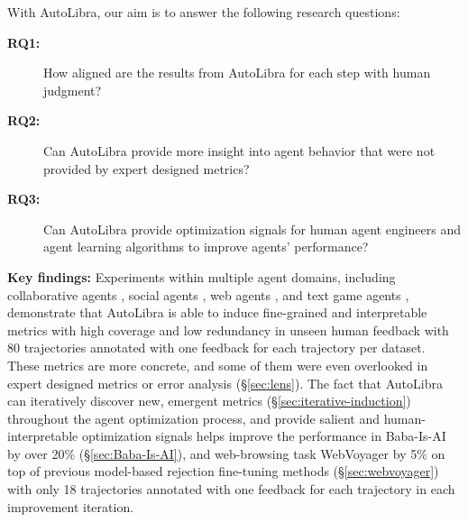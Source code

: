 With AutoLibra, our aim is to answer the following research questions:

\begin{description}
	\item[\textbf{RQ1:}] How aligned are the results from AutoLibra for each step with
		human judgment?

	\item[\textbf{RQ2:}] Can AutoLibra provide more insight into agent behavior that
		were not provided by expert designed metrics?

	\item[\textbf{RQ3:}] Can AutoLibra provide optimization signals for human agent
		engineers and agent learning algorithms to improve agents' performance?
\end{description}

\textbf{Key findings:} Experiments within multiple agent domains, including collaborative
agents \citep{shao2024collaborative}, social agents \citep{zhousotopia}, web agents
\citep{zhouwebarena,he2024webvoyager}, and text game agents \citep{paglieri2024balrog,cloos2024babaaibreakrules},
demonstrate that AutoLibra is able to induce fine-grained and interpretable metrics
with high coverage and low redundancy in unseen human feedback with 80 trajectories
annotated with one feedback for each trajectory per dataset. These metrics are
more concrete, and some of them were even overlooked in expert designed metrics or
error analysis (\S\ref{sec:lens}). The fact that AutoLibra can iteratively discover
new, emergent metrics (\S\ref{sec:iterative-induction}) throughout the agent optimization
process, and provide salient and human-interpretable optimization signals helps
improve the performance in Baba-Is-AI by over 20\% (\S\ref{sec:Baba-Is-AI}), and
web-browsing task WebVoyager by 5\% on top of previous model-based rejection
fine-tuning methods (\S\ref{sec:webvoyager}) with only 18 trajectories annotated
with one feedback for each trajectory in each improvement iteration.

